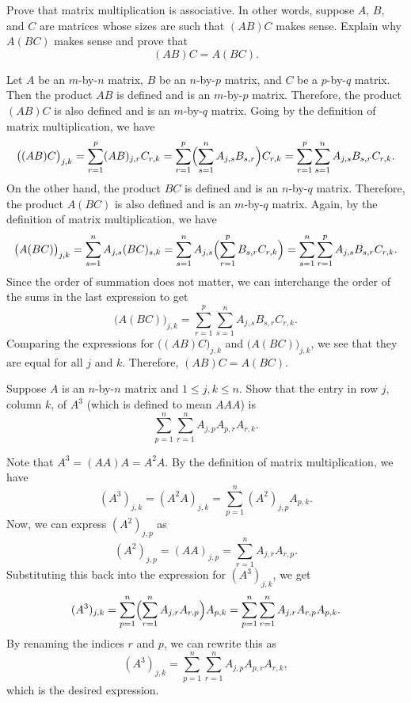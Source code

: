 \begin{exercise}
Prove that matrix multiplication is associative. In other words, suppose $A$,
$B$, and $C$ are matrices whose sizes are such that $(AB)C$ makes sense.
Explain why $A(BC)$ makes sense and prove that
\[ (AB)C = A(BC). \]
\end{exercise}
\begin{solution}

Let $A$ be an $m$-by-$n$ matrix, $B$ be an $n$-by-$p$ matrix, and $C$ be a
$p$-by-$q$ matrix. Then the product $AB$ is defined and is an $m$-by-$p$
matrix. Therefore, the product $(AB)C$ is also defined and is an $m$-by-$q$
matrix. Going by the definition of matrix multiplication, we have
\[ \bigl((AB)C\bigr)_{j,k} = \sum_{r=1}^p (AB)_{j,r}C_{r,k}
   = \sum_{r=1}^p\Bigl(\sum_{s=1}^n A_{j,s}B_{s,r}\Bigr)C_{r,k}
   = \sum_{r=1}^p\sum_{s=1}^n A_{j,s}B_{s,r}C_{r,k}. \]
On the other hand, the product $BC$ is defined and is an $n$-by-$q$ matrix.
Therefore, the product $A(BC)$ is also defined and is an $m$-by-$q$ matrix.
Again, by the definition of matrix multiplication, we have
\[ \bigl(A(BC)\bigr)_{j,k} = \sum_{s=1}^n A_{j,s}(BC)_{s,k}
   = \sum_{s=1}^n A_{j,s}\Bigl(\sum_{r=1}^p B_{s,r}C_{r,k}\Bigr)
   = \sum_{s=1}^n\sum_{r=1}^p A_{j,s}B_{s,r}C_{r,k}. \]
Since the order of summation does not matter, we can interchange the order of
the sums in the last expression to get
\[ \bigl(A(BC)\bigr)_{j,k} = \sum_{r=1}^p\sum_{s=1}^n A_{j,s}B_{s,r}C_{r,k}. \]
Comparing the expressions for $\bigl((AB)C\bigr)_{j,k}$ and
$\bigl(A(BC)\bigr)_{j,k}$, we see that they are equal for all $j$ and $k$.
Therefore, $(AB)C=A(BC)$.
\end{solution}

\begin{exercise}
Suppose $A$ is an $n$-by-$n$ matrix and $1\le j,k\le n$. Show that the entry
in row $j$, column $k$, of $A^3$ (which is defined to mean $AAA$) is
\[ \sum_{p=1}^n\sum_{r=1}^n A_{j,p}A_{p,r}A_{r,k}. \]
\end{exercise}
\begin{solution}
Note that $A^3=(AA)A=A^2A$. By the definition of matrix multiplication, we have
\[ (A^3)_{j,k} = (A^2A)_{j,k} = \sum_{p=1}^n (A^2)_{j,p}A_{p,k}. \]
Now, we can express $(A^2)_{j,p}$ as
\[ (A^2)_{j,p} = (AA)_{j,p} = \sum_{r=1}^n A_{j,r}A_{r,p}. \]
Substituting this back into the expression for $(A^3)_{j,k}$, we get
\[ (A^3)_{j,k} = \sum_{p=1}^n\Bigl(\sum_{r=1}^n A_{j,r}A_{r,p}\Bigr)A_{p,k}
   = \sum_{p=1}^n\sum_{r=1}^n A_{j,r}A_{r,p}A_{p,k}. \]
By renaming the indices $r$ and $p$, we can rewrite this as
\[ (A^3)_{j,k} = \sum_{p=1}^n\sum_{r=1}^n A_{j,p}A_{p,r}A_{r,k}, \]
which is the desired expression.
\end{solution}

